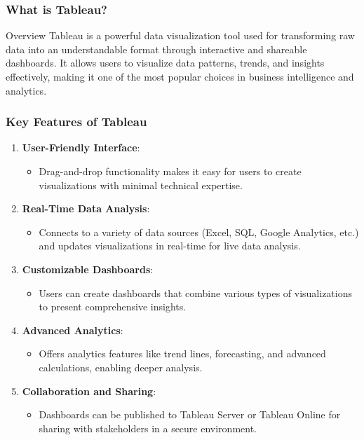 \documentclass[aspectratio=169]{beamer}
\begin{document}
\begin{frame}[fragile]
    \frametitle{What is Tableau?}
    \begin{block}{Overview}
        Tableau is a powerful data visualization tool used for transforming raw data into an understandable format through interactive and shareable dashboards. It allows users to visualize data patterns, trends, and insights effectively, making it one of the most popular choices in business intelligence and analytics.
    \end{block}
\end{frame}

\begin{frame}[fragile]
    \frametitle{Key Features of Tableau}
    \begin{enumerate}
        \item \textbf{User-Friendly Interface}:
        \begin{itemize}
            \item Drag-and-drop functionality makes it easy for users to create visualizations with minimal technical expertise.
        \end{itemize}

        \item \textbf{Real-Time Data Analysis}:
        \begin{itemize}
            \item Connects to a variety of data sources (Excel, SQL, Google Analytics, etc.) and updates visualizations in real-time for live data analysis.
        \end{itemize}

        \item \textbf{Customizable Dashboards}:
        \begin{itemize}
            \item Users can create dashboards that combine various types of visualizations to present comprehensive insights.
        \end{itemize}
        
        \item \textbf{Advanced Analytics}:
        \begin{itemize}
            \item Offers analytics features like trend lines, forecasting, and advanced calculations, enabling deeper analysis.
        \end{itemize}
        
        \item \textbf{Collaboration and Sharing}:
        \begin{itemize}
            \item Dashboards can be published to Tableau Server or Tableau Online for sharing with stakeholders in a secure environment.
        \end{itemize}
        

\end{enumerate}
\end{frame}
\end{document}
